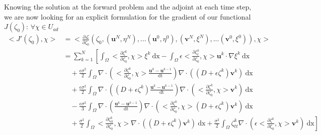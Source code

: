 \documentclass[11pt,a4paper]{article}
\begin{document}
		Knowing the solution at the forward problem and the adjoint at each time step, we are now looking for an explicit formulation for the gradient of our functional $J(\zeta_0)$: $\forall \chi \in U_{ad}$
		\begin{equation*}
			\begin{split}
				<\!J'(\zeta_0),\chi\!> &= <\! \frac{\partial \mathcal{L}}{\partial \zeta_0}(\zeta_0, (\mathbf{u}^N, \eta^N), ... (\mathbf{u}^0, \eta^0), 	(\mathbf{v}^N, \xi^N), ... (\mathbf{v}^0, \xi^0)), \chi\!> \\
				&= \sum^{N}_{k=1} \left[ \int_{\Omega} \! <\!\frac{\partial\zeta^k}{\partial \zeta_0}, \chi\!> \xi^k \: \mathrm{dx} - \int_{\Omega} \! \epsilon <\!\frac{\partial\zeta_t^k}{\partial \zeta_0}, \chi\!> \mathbf{u}^k \cdot \nabla \xi^k \: \mathrm{dx} \right.\\
				& \quad + \frac{\epsilon \sigma^2}{2} \int_{\Omega} \! \nabla \cdot \left( <\!\frac{\partial\zeta^k}{\partial \zeta_0}, \chi\!> \frac{\mathbf{u}^k - \mathbf{u}^{k-1}}{\mathrm{dt}} \right) \nabla \cdot \left( (D + \epsilon \zeta^k) \mathbf{v}^k \right) \: \mathrm{dx} \\
				& \quad + \frac{\epsilon \sigma^2}{2} \int_{\Omega} \! \nabla \cdot \left((D+\epsilon \zeta^k)\frac{\mathbf{u}^k - \mathbf{u}^{k-1}}{\mathrm{dt}}\right) \nabla \cdot \left(<\!\frac{\partial\zeta^k}{\partial \zeta_0}, \chi\!> \mathbf{v}^k \right) \: \mathrm{dx} \\
				&  \quad - \frac{\epsilon \sigma^2}{3} \int_{\Omega} \! \nabla \cdot \left( \frac{\mathbf{u}^k - \mathbf{u}^{k-1}}{\mathrm{dt}} \right) \nabla \cdot \left( <\!\frac{\partial\zeta^k}{\partial \zeta_0}, \chi\!> (D + \epsilon \zeta^k) \mathbf{v}^k \right) \: \mathrm{dx} \\
				& \left. \quad + \frac{\sigma^2}{2}\int_{\Omega} \! <\!\frac{\partial\zeta_{tt}^k}{\partial \zeta_0}, \chi\!> \nabla \cdot \left( (D + \epsilon \zeta^k) \mathbf{v}^k \right) \: \mathrm{dx} + \frac{\sigma^2}{2} \int_{\Omega} \! \zeta_{tt}^k \nabla \cdot \left( \epsilon <\!\frac{\partial\zeta^k}{\partial \zeta_0}, \chi\!> \mathbf{v}^k \right) \: \mathrm{dx} \right]
			\end{split}
		\end{equation*}
		
\end{document}
